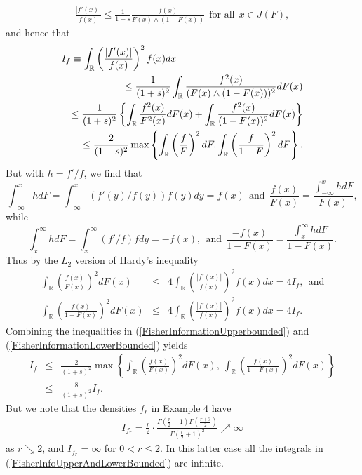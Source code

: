 \documentclass[11pt]{amsart}
\numberwithin{equation}{section}
\newcommand{\RR}{\mathbb{R}}
\theoremstyle{definition}\newtheorem{definition}{Definition}
\theoremstyle{remark}\newtheorem{assumption}{Assumption}
\theoremstyle{remark}\newtheorem{remark}{Remark}
\theoremstyle{definition}\newtheorem{example}{Example}
\theoremstyle{plain}\newtheorem{question}{Question}
\theoremstyle{plain}\newtheorem{theorem}{Theorem}
\theoremstyle{plain}\newtheorem{lemma}{Lemma}
\theoremstyle{plain}\newtheorem{proposition}{Proposition}
\theoremstyle{plain}\newtheorem{corollary}{Corollary}
\theoremstyle{plain}\newtheorem{conjecture}{Conjecture}
\begin{document}
\begin{eqnarray*}
\frac{| f' (x) |}{f(x)} \le \frac{1}{1+s} \frac{f(x)}{F(x) \wedge (1-F(x))}  \ \ \mbox{for all} \ \ x \in J(F),
\end{eqnarray*}
and hence that 
\begin{eqnarray}
\lefteqn{I_f \equiv \int_{\RR}  \left ( \frac{|f' (x)|}{f(x)} \right )^2 f(x) dx } \nonumber \\
&&  \le  \frac{1}{(1+s)^2}  \int_{\RR} \frac{f^2 (x)}{(F(x) \wedge (1-F(x)))^2} d F(x) \nonumber \\
&& \le  \frac{1}{(1+s)^2}  \left \{ \int_{\RR} \frac{f^2 (x)}{F^2(x)} dF(x) + \int_{\RR} \frac{f^2 (x)}{(1-F(x))^2} d F(x) \right \} \nonumber\\
&&  \le  \frac{2}{(1+s)^2} \max \left \{ \int_{\RR} \left ( \frac{f}{F} \right )^2 dF, \int_{\RR} \left ( \frac{f}{1-F} \right )^2 dF \right \} .
\label{FisherInformationUpperbounded}
\end{eqnarray}
But with $h = f'/f$, we find that 
$$
\int_{-\infty}^x  h dF = \int_{-\infty}^x (f'(y) / f(y) ) f(y) dy = f(x)  \ \ \mbox{and} \ \ \frac{f(x)}{F(x)} = \frac{\int_{-\infty}^x h dF}{F(x)} ,
$$
while 
$$
\int_x^{\infty} h dF = \int_x^{\infty} (f'/f) f dy = - f(x),  \ \ \mbox{and} \ \ \frac{-f(x)}{1-F(x)} = \frac{\int_x^\infty h dF }{1-F(x)} .
$$
Thus by the $L_2$ version of Hardy's inequality 
\begin{eqnarray}
\int_{\RR} \left ( \frac{f(x)}{F(x)} \right )^2 d F(x) 
& \le  &4  \int_{\RR} \left ( \frac{|f' (x)|}{f(x)} \right )^2 f(x) dx  = 4 I_f, \ \ \mbox{and}  \nonumber \\
              \int_{\RR} \left ( \frac{f(x)}{1-F(x)} \right )^2 d F(x) 
& \le &  4  \int_{\RR} \left ( \frac{|f' (x)|}{f(x)} \right )^2 f(x) dx  = 4 I_f .
\label{FisherInformationLowerBounded}
\end{eqnarray} 
Combining the inequalities in  (\ref{FisherInformationUpperbounded}) and (\ref{FisherInformationLowerBounded}) yields
\begin{eqnarray}
I_f & \le & \frac{2}{(1+s)^2} \max \left \{ \int_{\RR} \left ( \frac{f(x)}{F(x)} \right )^2 d F(x) , 
\ \int_{\RR} \left ( \frac{f(x)}{1-F(x)} \right )^2 d F(x) \right \}  \nonumber \\
& \le & \frac{8}{(1+s)^2} I_f .
\label{FisherInfoUpperAndLowerBounded}
\end{eqnarray}
But we note that the densities $f_r$ in Example 4 have
\begin{eqnarray*}
I_{f_r} = \frac{r}{2} \cdot \frac{\Gamma \left (\frac{r}{2}-1\right) 
\Gamma \left ( \frac{r+3}{2} \right )}{\Gamma \left ( \frac{r}{2} +1 \right )^2} \nearrow \infty
\end{eqnarray*}
as $r \searrow 2$, and $I_{f_r} = \infty$ for $0 < r \le 2$.  
In this latter case all the integrals in (\ref{FisherInfoUpperAndLowerBounded}) are infinite.
 
\end{document}
